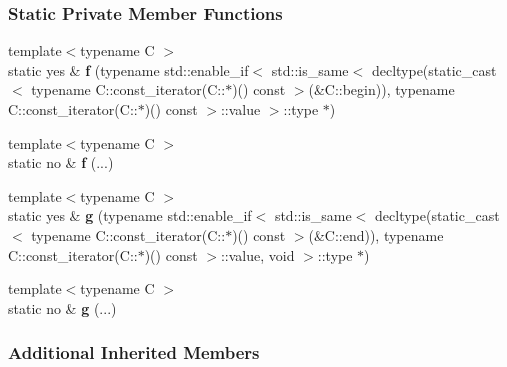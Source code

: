 \subsubsection*{Static Private Member Functions}
\begin{DoxyCompactItemize}
\item 
{\footnotesize template$<$typename C $>$ }\\static yes \& {\bfseries f} (typename std\+::enable\+\_\+if$<$ std\+::is\+\_\+same$<$ decltype(static\+\_\+cast$<$ typename C\+::const\+\_\+iterator(C\+::$\ast$)() const  $>$(\&C\+::begin)), typename C\+::const\+\_\+iterator(C\+::$\ast$)() const  $>$\+::value $>$\+::type $\ast$)\hypertarget{structpretty__print_1_1detail_1_1has__begin__end_ab37db7c1f89969bdf7c0dfbdaa9539ac}{}\label{structpretty__print_1_1detail_1_1has__begin__end_ab37db7c1f89969bdf7c0dfbdaa9539ac}

\item 
{\footnotesize template$<$typename C $>$ }\\static no \& {\bfseries f} (...)\hypertarget{structpretty__print_1_1detail_1_1has__begin__end_a28f2fc1f2b78c2cd068d57d97ebdb9d8}{}\label{structpretty__print_1_1detail_1_1has__begin__end_a28f2fc1f2b78c2cd068d57d97ebdb9d8}

\item 
{\footnotesize template$<$typename C $>$ }\\static yes \& {\bfseries g} (typename std\+::enable\+\_\+if$<$ std\+::is\+\_\+same$<$ decltype(static\+\_\+cast$<$ typename C\+::const\+\_\+iterator(C\+::$\ast$)() const  $>$(\&C\+::end)), typename C\+::const\+\_\+iterator(C\+::$\ast$)() const  $>$\+::value, void $>$\+::type $\ast$)\hypertarget{structpretty__print_1_1detail_1_1has__begin__end_a76a1f4836f14a223d78e352e35fa638c}{}\label{structpretty__print_1_1detail_1_1has__begin__end_a76a1f4836f14a223d78e352e35fa638c}

\item 
{\footnotesize template$<$typename C $>$ }\\static no \& {\bfseries g} (...)\hypertarget{structpretty__print_1_1detail_1_1has__begin__end_aacdd6dbc7a08021d60fadb3ec122074d}{}\label{structpretty__print_1_1detail_1_1has__begin__end_aacdd6dbc7a08021d60fadb3ec122074d}

\end{DoxyCompactItemize}
\subsubsection*{Additional Inherited Members}


